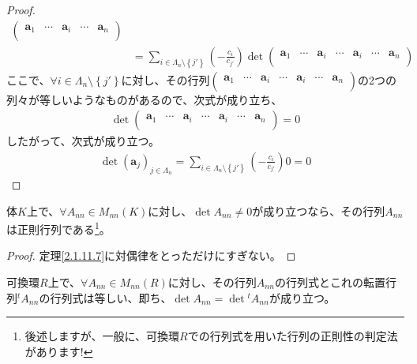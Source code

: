 \documentclass[dvipdfmx]{jsarticle}
\begin{document}
\begin{proof}
\begin{align*}
{\begin{pmatrix}
\mathbf{a}_{1} & \cdots & \mathbf{a}_{i} & \cdots & \mathbf{a}_{n} \\
\end{pmatrix}}\\
&= \sum_{i \in \varLambda_{n} \setminus \left\{ j' \right\}} {\left( - \frac{c_{i}}{c_{j'}} \right)\det\begin{pmatrix}
\mathbf{a}_{1} & \cdots & \mathbf{a}_{i} & \cdots & \mathbf{a}_{i} & \cdots & \mathbf{a}_{n} \\
\end{pmatrix}}
\end{align*}
ここで、$\forall i \in \varLambda_{n} \setminus \left\{ j' \right\}$に対し、その行列$\begin{pmatrix}
\mathbf{a}_{1} & \cdots & \mathbf{a}_{i} & \cdots & \mathbf{a}_{i} & \cdots & \mathbf{a}_{n} \\
\end{pmatrix}$の2つの列々が等しいようなものがあるので、次式が成り立ち、
\begin{align*}
\det\begin{pmatrix}
\mathbf{a}_{1} & \cdots & \mathbf{a}_{i} & \cdots & \mathbf{a}_{i} & \cdots & \mathbf{a}_{n} \\
\end{pmatrix} = 0
\end{align*}
したがって、次式が成り立つ。
\begin{align*}
\det\left( \mathbf{a}_{j} \right)_{j \in \varLambda_{n}} = \sum_{i \in \varLambda_{n} \setminus \left\{ j' \right\}} {\left( - \frac{c_{i}}{c_{j'}} \right)0} = 0
\end{align*}
\end{proof}
\begin{thm}\label{2.1.11.8}
体$K$上で、$\forall A_{nn} \in M_{nn}(K)$に対し、$\det A_{nn} \neq 0$が成り立つなら、その行列$A_{nn}$は正則行列である\footnote{後述しますが、一般に、可換環$R$での行列式を用いた行列の正則性の判定法があります!}。
\end{thm}
\begin{proof} 定理\ref{2.1.11.7}に対偶律をとっただけにすぎない。
\end{proof}
\begin{thm}\label{2.1.11.9}
可換環$R$上で、$\forall A_{nn} \in M_{nn}(R)$に対し、その行列$A_{nn}$の行列式とこれの転置行列$^{t}A_{nn}$の行列式は等しい、即ち、$\det A_{nn} = \det{^{t}A_{nn}}$が成り立つ。
\end{thm}
\end{document}
